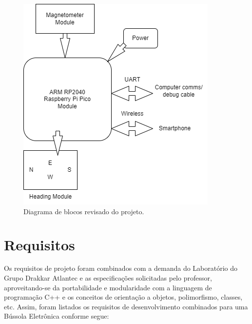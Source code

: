 \documentclass[10pt,twocolumn,letterpaper]{article}
\begin{document}
\begin{figure}[ht]
  \centering
  \includegraphics[width=\linewidth]{figures/ProjetoFinalCPP_Diagrama.png}
  \caption{Diagrama de blocos revisado do projeto.}
  \label{fig:Diagrama_blocos}
\end{figure}

\section{Requisitos}

Os requisitos de projeto foram combinados com a demanda do Laboratório do Grupo Drakkar Atlantec e as 
especificações solicitadas pelo professor, aproveitando-se da portabilidade e modularidade com a 
linguagem de programação C++ e os conceitos de orientação a objetos, polimorfismo, classes, etc. Assim, 
foram listados os requisitos de desenvolvimento combinados para uma Bússola Eletrônica conforme segue:
\end{document}
